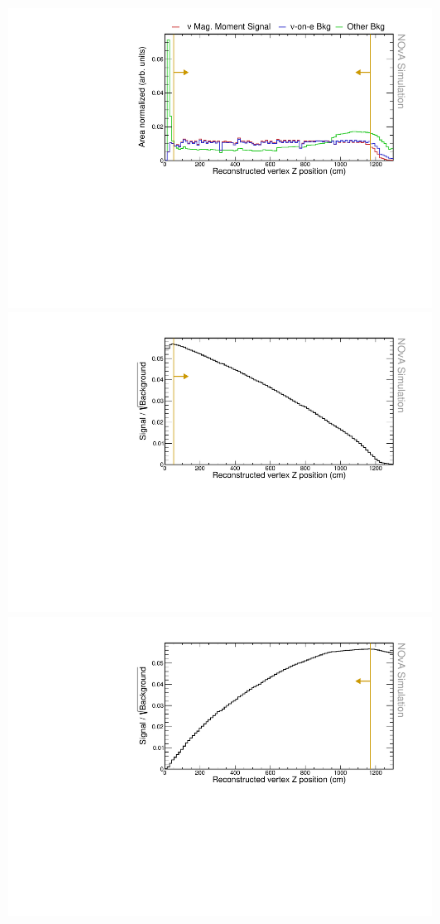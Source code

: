 \begin{figure}[hbtp]
\centering
\includegraphics[width=.9\textwidth]{Plots/NuMMEventSelection/N1Cut_vtxZ.pdf}
\includegraphics[width=.9\textwidth]{Plots/NuMMEventSelection/NuMM_N1Cut_vtxZright_FOMStats.pdf}
\includegraphics[width=.9\textwidth]{Plots/NuMMEventSelection/NuMM_N1Cut_vtxZleft_FOMStats.pdf}

\end{figure}
